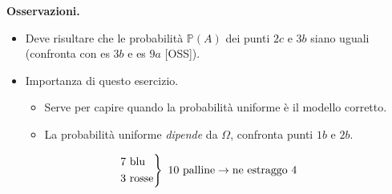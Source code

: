 \textbf{Osservazioni.}
\begin{itemize}
\item Deve risultare che le probabilità $\mathbb{P}( A)$ dei punti $2c$ e $3b$ siano uguali (confronta con es $3b$ e es $9a$ [OSS]).
\item Importanza di questo esercizio.
\begin{itemize}
\item Serve per capire quando la probabilità uniforme è il modello corretto.
\item La probabilità uniforme \textit{dipende} da $\Omega $, confronta punti $1b$ e $2b$.
\end{itemize}
\end{itemize}
\Soluzione
\begin{equation*}
\begin{drcases}
7\ \text{blu}\\
3\ \text{rosse}
\end{drcases} \ 10\ \text{palline}\rightarrow \text{ne estraggo} \ 4
\end{equation*}
